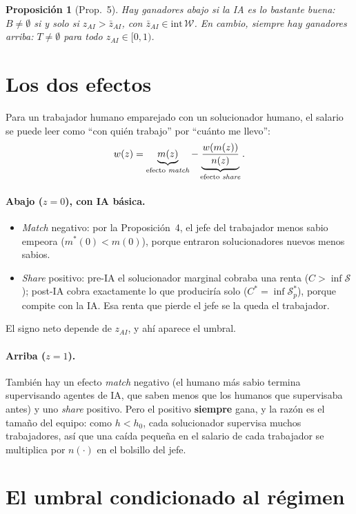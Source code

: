 \documentclass[11pt]{article}
\newtheorem{proposicion}{Proposición}
\theoremstyle{definition}
\theoremstyle{remark}
\newcommand{\zai}{z_{AI}}
\newcommand{\W}{\mathcal W}
\newcommand{\Sset}{\mathcal S}
\begin{document}
\begin{proposicion}[Prop.~5]
Hay ganadores abajo si la IA es lo bastante buena: $B\neq\emptyset$ si y solo si $\zai>\bar z_{AI}$, con
$\bar z_{AI}\in\text{int}\,\W$. En cambio, siempre hay ganadores arriba: $T\neq\emptyset$ para todo
$\zai\in[0,1)$.
\end{proposicion}

\section{Los dos efectos}

Para un trabajador humano emparejado con un solucionador humano, el salario se puede leer como ``con quién trabajo'' por ``cuánto me llevo'':
\[
  w(z)=\underbrace{m(z)}_{\text{efecto \emph{match}}}-\underbrace{\frac{w(m(z))}{n(z)}}_{\text{efecto \emph{share}}}.
\]

\paragraph{Abajo ($z=0$), con IA básica.}
\begin{itemize}
  \item \emph{Match} negativo: por la Proposición~4, el jefe del trabajador menos sabio empeora
  ($m^{*}(0)<m(0)$), porque entraron solucionadores nuevos menos sabios.
  \item \emph{Share} positivo: pre-IA el solucionador marginal cobraba una renta ($C>\inf\Sset$);
  post-IA cobra exactamente lo que produciría solo ($C^{*}=\inf\Sset_p^{*}$), porque compite con la IA.
  Esa renta que pierde el jefe se la queda el trabajador.
\end{itemize}
El signo neto depende de $\zai$, y ahí aparece el umbral.

\paragraph{Arriba ($z=1$).}
También hay un efecto \emph{match} negativo (el humano más sabio termina supervisando agentes de IA, que
saben menos que los humanos que supervisaba antes) y uno \emph{share} positivo. Pero el positivo
\textbf{siempre} gana, y la razón es el tamaño del equipo: como $h<h_0$, cada solucionador supervisa
muchos trabajadores, así que una caída pequeña en el salario de cada trabajador se multiplica por
$n(\cdot)$ en el bolsillo del jefe.

\section{El umbral condicionado al régimen}
\end{document}
